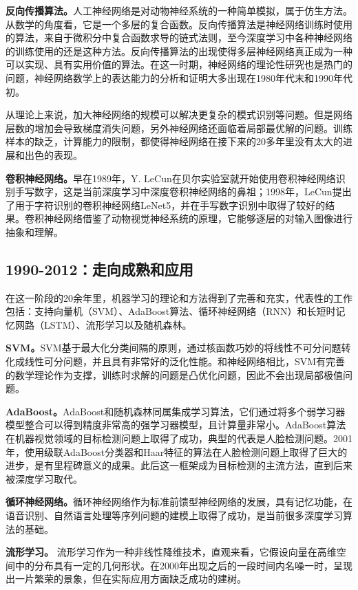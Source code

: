\textbf{反向传播算法。}人工神经网络是对动物神经系统的一种简单模拟，属于仿生方法。从数学的角度看，它是一个多层的复合函数。反向传播算法是神经网络训练时使用的算法，来自于微积分中复合函数求导的链式法则，至今深度学习中各种神经网络的训练使用的还是这种方法。反向传播算法的出现使得多层神经网络真正成为一种可以实现、具有实用价值的算法。在这一时期，神经网络的理论性研究也是热门的问题，神经网络数学上的表达能力的分析和证明大多出现在1980年代末和1990年代初。

从理论上来说，加大神经网络的规模可以解决更复杂的模式识别等问题。但是网络层数的增加会导致梯度消失问题，另外神经网络还面临着局部最优解的问题。训练样本的缺乏，计算能力的限制，都使得神经网络在接下来的20多年里没有太大的进展和出色的表现。

\textbf{卷积神经网络。}早在1989年，Y. LeCun在贝尔实验室就开始使用卷积神经网络识别手写数字\parencite{lecun1989backpropagation}，这是当前深度学习中深度卷积神经网络的鼻祖；1998年，LeCun提出了用于字符识别的卷积神经网络LeNet5，并在手写数字识别中取得了较好的结果。卷积神经网络借鉴了动物视觉神经系统的原理，它能够逐层的对输入图像进行抽象和理解。

\subsection{1990-2012：走向成熟和应用}
在这一阶段的20余年里，机器学习的理论和方法得到了完善和充实，代表性的工作包括：支持向量机（SVM）\parencite{cortes1995support}、AdaBoost算法\parencite{freund1995boosting}、循环神经网络（RNN）和长短时记忆网路（LSTM）\parencite{hochreiter1997long}、流形学习\parencite{roweis2000nonlinear}以及随机森林\parencite{breiman2001random}。

\textbf{SVM。}SVM基于最大化分类间隔的原则，通过核函数巧妙的将线性不可分问题转化成线性可分问题，并且具有非常好的泛化性能。和神经网络相比，SVM有完善的数学理论作为支撑，训练时求解的问题是凸优化问题，因此不会出现局部极值问题。

\textbf{AdaBoost。}AdaBoost和随机森林同属集成学习算法，它们通过将多个弱学习器模型整合可以得到精度非常高的强学习器模型，且计算量非常小。AdaBoost算法在机器视觉领域的目标检测问题上取得了成功，典型的代表是人脸检测问题。2001年，使用级联AdaBoost分类器和Haar特征的算法在人脸检测问题上取得了巨大的进步，是有里程碑意义的成果。此后这一框架成为目标检测的主流方法，直到后来被深度学习取代。

\textbf{循环神经网络。}循环神经网络作为标准前馈型神经网络的发展，具有记忆功能，在语音识别、自然语言处理等序列问题的建模上取得了成功，是当前很多深度学习算法的基础。

\textbf{流形学习。}
流形学习作为一种非线性降维技术，直观来看，它假设向量在高维空间中的分布具有一定的几何形状。在2000年出现之后的一段时间内名噪一时，呈现出一片繁荣的景象，但在实际应用方面缺乏成功的建树。

